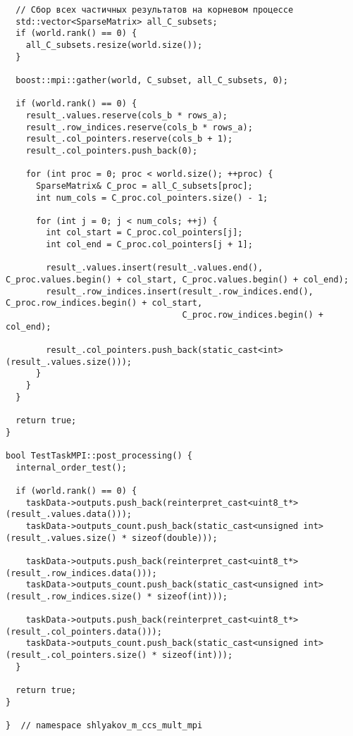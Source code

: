 \documentclass[12pt]{article}
\begin{document}
\begin{verbatim}
  // Сбор всех частичных результатов на корневом процессе
  std::vector<SparseMatrix> all_C_subsets;
  if (world.rank() == 0) {
    all_C_subsets.resize(world.size());
  }

  boost::mpi::gather(world, C_subset, all_C_subsets, 0);

  if (world.rank() == 0) {
    result_.values.reserve(cols_b * rows_a);
    result_.row_indices.reserve(cols_b * rows_a);
    result_.col_pointers.reserve(cols_b + 1);
    result_.col_pointers.push_back(0);

    for (int proc = 0; proc < world.size(); ++proc) {
      SparseMatrix& C_proc = all_C_subsets[proc];
      int num_cols = C_proc.col_pointers.size() - 1;

      for (int j = 0; j < num_cols; ++j) {
        int col_start = C_proc.col_pointers[j];
        int col_end = C_proc.col_pointers[j + 1];

        result_.values.insert(result_.values.end(), C_proc.values.begin() + col_start, C_proc.values.begin() + col_end);
        result_.row_indices.insert(result_.row_indices.end(), C_proc.row_indices.begin() + col_start,
                                   C_proc.row_indices.begin() + col_end);

        result_.col_pointers.push_back(static_cast<int>(result_.values.size()));
      }
    }
  }

  return true;
}

bool TestTaskMPI::post_processing() {
  internal_order_test();

  if (world.rank() == 0) {
    taskData->outputs.push_back(reinterpret_cast<uint8_t*>(result_.values.data()));
    taskData->outputs_count.push_back(static_cast<unsigned int>(result_.values.size() * sizeof(double)));

    taskData->outputs.push_back(reinterpret_cast<uint8_t*>(result_.row_indices.data()));
    taskData->outputs_count.push_back(static_cast<unsigned int>(result_.row_indices.size() * sizeof(int)));

    taskData->outputs.push_back(reinterpret_cast<uint8_t*>(result_.col_pointers.data()));
    taskData->outputs_count.push_back(static_cast<unsigned int>(result_.col_pointers.size() * sizeof(int)));
  }

  return true;
}

}  // namespace shlyakov_m_ccs_mult_mpi
\end{verbatim}
\end{document}
